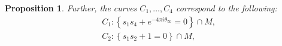 \documentclass[a4paper,reqno]{amsart}
\numberwithin{equation}{section}
\newtheorem{proposition}[theorem]{Proposition}
\numberwithin{equation}{section}
\begin{document}
\begin{proposition}
        Further, the curves $C_1,\dots,C_4$ correspond to the following:
    \begin{equation} \label{eq:stokesdataconicsPIV}
    \begin{aligned}
            &C_1 : \left\{ s_1 s_4 + e^{-4 \pi i \theta_{\infty}}=0\right\}\cap M, \\
            &C_2 : \left\{ s_1 s_2 + 1=0\right\}\cap M, \\

\end{aligned}
\end{equation}
\end{proposition}
\end{document}
